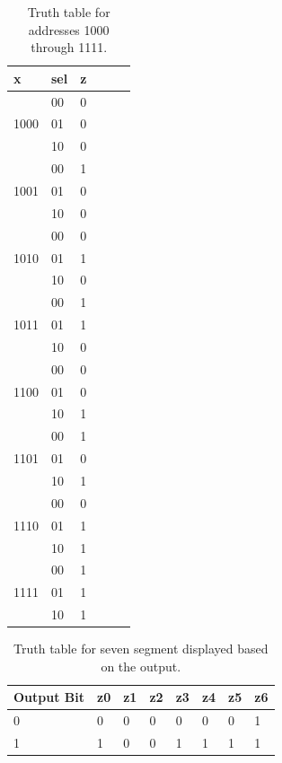 \documentclass[11pt]{article}
\begin{document}
\begin{minipage}[t]{0.2\textwidth}
\end{minipage}
\begin{minipage}[t]{0.4\textwidth}
\begin{table}[H]
\begin{center}
\begin{tabular}{| l | l | l | l | l | l |}
	\hline
	x & sel & z \\ \hline
	\multirow{3}{*}{1000} & 00 & 0 \\
	& 01 & 0 \\
	& 10 & 0 \\ \hline
	\multirow{3}{*}{1001} & 00 & 1 \\
	& 01 & 0 \\
	& 10 & 0 \\ \hline
	\multirow{3}{*}{1010} & 00 & 0 \\
	& 01 & 1 \\
	& 10 & 0 \\ \hline
	\multirow{3}{*}{1011} & 00 & 1 \\
	& 01 & 1 \\
	& 10 & 0 \\ \hline
	\multirow{3}{*}{1100} & 00 & 0 \\
	& 01 & 0 \\
	& 10 & 1 \\ \hline
	\multirow{3}{*}{1101} & 00 & 1 \\
	& 01 & 0 \\
	& 10 & 1 \\ \hline
	\multirow{3}{*}{1110} & 00 & 0 \\
	& 01 & 1 \\
	& 10 & 1 \\ \hline
	\multirow{3}{*}{1111} & 00 & 1 \\
	& 01 & 1 \\
	& 10 & 1 \\ \hline
\end{tabular}
\caption{\label{tab:romMuxTruthTable2}Truth table for addresses 1000 through 1111.}
\end{center}
\end{table}
\end{minipage}

\begin{table}[H]
\begin{center}
\begin{tabular}{| l | l | l | l | l | l | l | l |}
	\hline
	Output Bit & z0 & z1 & z2 & z3 & z4 & z5 & z6 \\ \hline
	0 & 0 & 0 & 0 & 0 & 0 & 0 & 1 \\ \hline
	1 & 1 & 0 & 0 & 1 & 1 & 1 & 1 \\ \hline 
\end{tabular}
\caption{\label{tab:sevenSegTruthTable}Truth table for seven segment displayed based on the output.}
\end{center}
\end{table}
\end{document}
